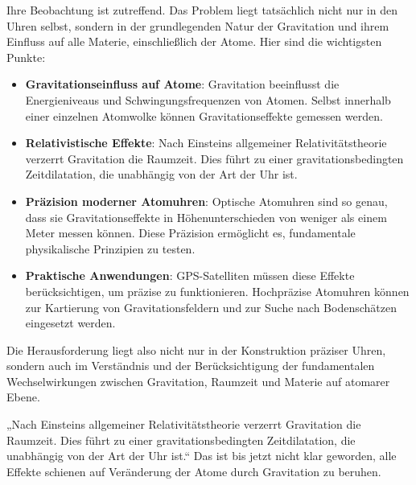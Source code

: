 \documentclass[a4paper,12pt]{article}
\begin{document}
	Ihre Beobachtung ist zutreffend. Das Problem liegt tatsächlich nicht nur in den Uhren selbst, sondern in der grundlegenden Natur der Gravitation und ihrem Einfluss auf alle Materie, einschließlich der Atome. Hier sind die wichtigsten Punkte:
	\begin{itemize}
		\item \textbf{Gravitationseinfluss auf Atome}: Gravitation beeinflusst die Energieniveaus und Schwingungsfrequenzen von Atomen. Selbst innerhalb einer einzelnen Atomwolke können Gravitationseffekte gemessen werden.
		\item \textbf{Relativistische Effekte}: Nach Einsteins allgemeiner Relativitätstheorie verzerrt Gravitation die Raumzeit. Dies führt zu einer gravitationsbedingten Zeitdilatation, die unabhängig von der Art der Uhr ist.
		\item \textbf{Präzision moderner Atomuhren}: Optische Atomuhren sind so genau, dass sie Gravitationseffekte in Höhenunterschieden von weniger als einem Meter messen können. Diese Präzision ermöglicht es, fundamentale physikalische Prinzipien zu testen.
		\item \textbf{Praktische Anwendungen}: GPS-Satelliten müssen diese Effekte berücksichtigen, um präzise zu funktionieren. Hochpräzise Atomuhren können zur Kartierung von Gravitationsfeldern und zur Suche nach Bodenschätzen eingesetzt werden.
	\end{itemize}
	Die Herausforderung liegt also nicht nur in der Konstruktion präziser Uhren, sondern auch im Verständnis und der Berücksichtigung der fundamentalen Wechselwirkungen zwischen Gravitation, Raumzeit und Materie auf atomarer Ebene.
	
	„Nach Einsteins allgemeiner Relativitätstheorie verzerrt Gravitation die Raumzeit. Dies führt zu einer gravitationsbedingten Zeitdilatation, die unabhängig von der Art der Uhr ist.“ Das ist bis jetzt nicht klar geworden, alle Effekte schienen auf Veränderung der Atome durch Gravitation zu beruhen.
	
\end{document}
